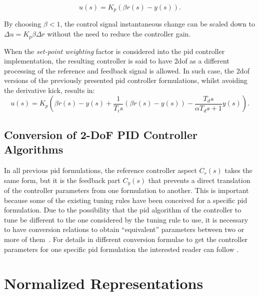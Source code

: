 \begin{equation}
u(s)=K_p(\beta r(s) - y(s)).
\end{equation}

By choosing $\beta < 1$, the control signal instantaneous change can be scaled down to $\Delta u = K_p \beta \Delta r$  without the need to reduce the controller gain. 

When the \emph{set-point weighting} factor is considered into the \gls{pid} controller implementation, the resulting controller is said to have \gls{2dof} as a different processing of the reference and feedback signal is allowed. In such case, the \gls{2dof} versions of the previously presented \gls{pid} controller formulations, whilst avoiding the derivative kick, results in:
\begin{equation}
u(s)= K_p \left( \beta r(s) - y(s) + \frac{1}{T_i s} (\beta r(s) - y(s)) - \frac{T_ds}{\alpha T_d s+1} y(s) \right ).
\label{eq:PIDstandard2DoF}
\end{equation}

\subsection{Conversion of 2-DoF PID Controller Algorithms}
In all previous \gls{pid} formulations, the reference controller aspect $C_r(s)$ takes the same form, but it is the feedback part $C_y(s)$ that prevents a direct translation of the controller parameters from one formulation to another. This is important because some of the existing tuning rules have been conceived for a specific \gls{pid} formulation. Due to the possibility that the \gls{pid} algorithm of the controller to tune be different to the one considered by the tuning rule to use, it is necessary to have conversion relations to obtain ``equivalent'' parameters between two or more of them~\citep{alfaroetfa2012-2, vilanova2017WEE}.  For details in different conversion formulae to get the controller parameters for one specific \gls{pid} formulation the interested reader can follow \citet{Alfaro2016}.


\section{Normalized Representations}
\label{sec:4}

